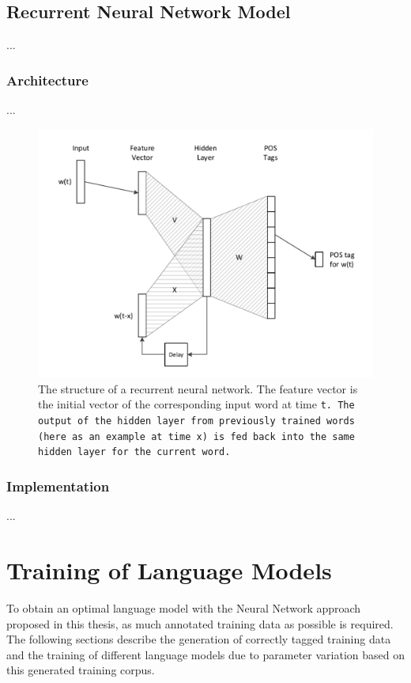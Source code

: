 \section{Recurrent Neural Network Model}\label{c.postagging.rnn}
...

\subsection{Architecture}\label{c.postagging.rnn.architecture}
...
\begin{figure}[H]
	\includegraphics[width=\textwidth]{images/rnn_structure}
	\caption[Structure of a Recurrent Neural Network]{The structure of a recurrent neural network. The feature vector is the initial vector of the corresponding input word at time \tt{t}. The output of the hidden layer from previously trained words (here as an example at time \tt{x}) is fed back into the same hidden layer for the current word.}
	\label{f.rnn_structure}
\end{figure}

\subsection{Implementation}\label{c.postagging.rnn.implementation}
...

\chapter{Training of Language Models}\label{c.training}
To obtain an optimal language model with the Neural Network approach proposed in this thesis, as much annotated training data as possible is required. The following sections describe the generation of correctly tagged training data and the training of different language models due to parameter variation based on this generated training corpus.

